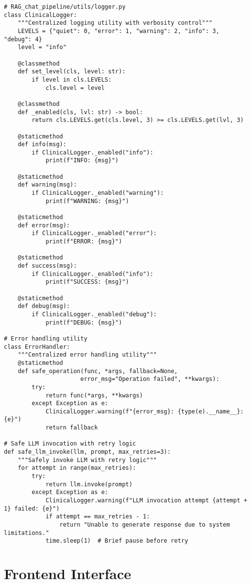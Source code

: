 \begin{verbatim}
# RAG_chat_pipeline/utils/logger.py
class ClinicalLogger:
    """Centralized logging utility with verbosity control"""
    LEVELS = {"quiet": 0, "error": 1, "warning": 2, "info": 3, "debug": 4}
    level = "info"

    @classmethod
    def set_level(cls, level: str):
        if level in cls.LEVELS:
            cls.level = level

    @classmethod
    def _enabled(cls, lvl: str) -> bool:
        return cls.LEVELS.get(cls.level, 3) >= cls.LEVELS.get(lvl, 3)

    @staticmethod
    def info(msg):
        if ClinicalLogger._enabled("info"):
            print(f"INFO: {msg}")

    @staticmethod
    def warning(msg):
        if ClinicalLogger._enabled("warning"):
            print(f"WARNING: {msg}")

    @staticmethod
    def error(msg):
        if ClinicalLogger._enabled("error"):
            print(f"ERROR: {msg}")

    @staticmethod
    def success(msg):
        if ClinicalLogger._enabled("info"):
            print(f"SUCCESS: {msg}")

    @staticmethod
    def debug(msg):
        if ClinicalLogger._enabled("debug"):
            print(f"DEBUG: {msg}")

# Error handling utility
class ErrorHandler:
    """Centralized error handling utility"""
    @staticmethod
    def safe_operation(func, *args, fallback=None, 
                      error_msg="Operation failed", **kwargs):
        try:
            return func(*args, **kwargs)
        except Exception as e:
            ClinicalLogger.warning(f"{error_msg}: {type(e).__name__}: {e}")
            return fallback

# Safe LLM invocation with retry logic
def safe_llm_invoke(llm, prompt, max_retries=3):
    """Safely invoke LLM with retry logic"""
    for attempt in range(max_retries):
        try:
            return llm.invoke(prompt)
        except Exception as e:
            ClinicalLogger.warning(f"LLM invocation attempt {attempt + 1} failed: {e}")
            if attempt == max_retries - 1:
                return "Unable to generate response due to system limitations."
            time.sleep(1)  # Brief pause before retry
\end{verbatim}

\section{Frontend Interface}


